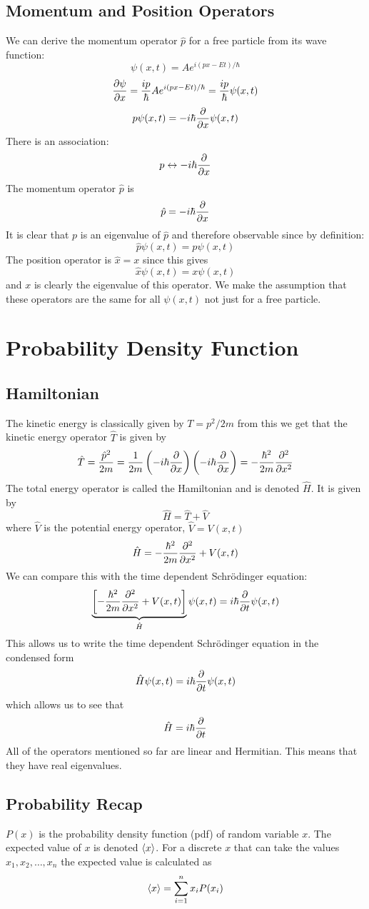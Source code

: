 \documentclass{article}
\begin{document}
    \subsection{Momentum and Position Operators}
    We can derive the momentum operator \(\hat p\) for a free particle from its wave function:
    \[\psi(x, t) = Ae^{i(px - Et)/\hbar}\]
    \[\pdv{\psi}{x} = \frac{ip}{\hbar}Ae^{i(px - Et)/\hbar} = \frac{ip}{\hbar}\psi(x, t)\]
    \[p\psi(x, t) = -i\hbar\pdv{x}\psi(x, t)\]
    There is an association:
    \[p\leftrightarrow -i\hbar\pdv{x}\]
    The momentum operator \(\hat p\) is
    \[\hat p = -i\hbar\pdv{x}\]
    It is clear that \(p\) is an eigenvalue of \(\hat p\) and therefore observable since by definition:
    \[\hat p\psi(x, t) = p\psi(x, t)\]
    The position operator is \(\hat x = x\) since this gives
    \[\hat x\psi(x, t) = x\psi(x, t)\]
    and \(x\) is clearly the eigenvalue of this operator.
    We make the assumption that these operators are the same for all \(\psi(x, t)\) not just for a free particle.
    
    \section{Probability Density Function}
    \subsection{Hamiltonian}
    The kinetic energy is classically given by \(T = p^2/2m\) from this we get that the kinetic energy operator \(\hat T\) is given by
    \[\hat T = \frac{\hat p^2}{2m} = \frac{1}{2m}\left(-i\hbar\pdv{x}\right)\left(-i\hbar\pdv{x}\right) = -\frac{\hbar^2}{2m}\pdv[2]{x}\]
    The total energy operator is called the Hamiltonian and is denoted \(\hat H\). It is given by
    \[\hat H = \hat T + \hat V\]
    where \(\hat V\) is the potential energy operator, \(\hat V = V(x, t)\)
    \[\hat H = -\frac{\hbar^2}{2m}\pdv[2]{x} + V(x, t)\]
    We can compare this with the time dependent Schr\"odinger equation:
    \[\underbrace{\left[-\frac{\hbar^2}{2m}\pdv[2]{x} + V(x, t)\right]}_{\hat H}\psi(x, t) = i\hbar\pdv{t}\psi(x, t)\]
    This allows us to write the time dependent Schr\"odinger equation in the condensed form
    \[\hat H\psi(x, t) = i\hbar \pdv{t}\psi(x, t)\]
    which allows us to see that
    \[\hat H = i\hbar\pdv{t}\]
    All of the operators mentioned so far are linear and Hermitian.
    This means that they have real eigenvalues.
    
    \subsection{Probability Recap}
    \(P(x)\) is the probability density function (pdf) of random variable \(x\).
    The expected value of \(x\) is denoted \(\left\langle{x}\right\rangle\).
    For a discrete \(x\) that can take the values \(x_1, x_2, \dotsc, x_n\) the expected value is calculated as
    \[\left\langle{x}\right\rangle = \sum_{i=1}^nx_iP(x_i)\]
    
\end{document}
